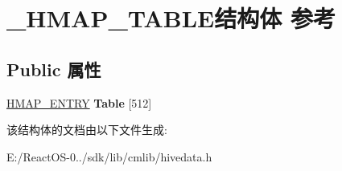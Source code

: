 \hypertarget{struct___h_m_a_p___t_a_b_l_e}{}\section{\+\_\+\+H\+M\+A\+P\+\_\+\+T\+A\+B\+L\+E结构体 参考}
\label{struct___h_m_a_p___t_a_b_l_e}
\subsection*{Public 属性}
\begin{DoxyCompactItemize}
\item 
\mbox{\label{struct___h_m_a_p___t_a_b_l_e_a3b6587729afb1b111cfc76ea818bdc88}} 
\hyperlink{struct___h_m_a_p___e_n_t_r_y}{H\+M\+A\+P\+\_\+\+E\+N\+T\+RY} {\bfseries Table} \mbox{[}512\mbox{]}
\end{DoxyCompactItemize}


该结构体的文档由以下文件生成\+:\begin{DoxyCompactItemize}
\item 
E\+:/\+React\+O\+S-\/0../sdk/lib/cmlib/hivedata.\+h\end{DoxyCompactItemize}
